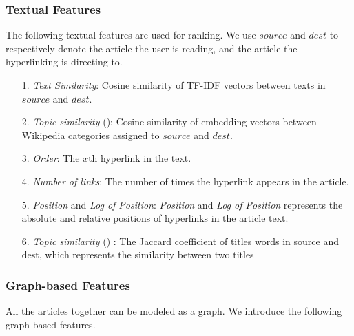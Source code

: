 \subsubsection{Textual Features} \label{textual_features}

The following textual features are used for ranking. We use $source$ and $dest$ to respectively denote the article the user is reading, and the article the hyperlinking is directing to.

\begin{itemize}

    \item[1.] \emph{Text Similarity}: Cosine similarity of TF-IDF vectors between texts in $source$ and $dest$.

    \item[2.] \emph{Topic similarity} (\cite{dimitrov2017makes}): Cosine similarity of embedding vectors between Wikipedia categories assigned to $source$ and $dest$.

    \item[3.] \emph{Order}: The $x$th hyperlink in the text.

    \item[4.] \emph{Number of links}: The number of times the hyperlink appears in the article. 

    \item[5.] \emph{Position} and \emph{Log of Position}: \emph{Position} and \emph{Log of Position} represents the absolute and relative positions of hyperlinks in the article text.

    \item[6.] \emph{Topic similarity} (\cite{thruesen2016link}) : The Jaccard coefficient of titles words in
    source and dest, which represents the similarity between two titles

\end{itemize}

\subsubsection{Graph-based Features} \label{graph-based_features}

All the articles together can be modeled as a graph. We introduce the following graph-based features.

